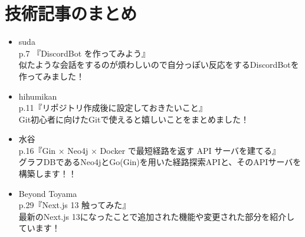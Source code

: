 \chapter{技術記事のまとめ}

\begin{itemize}
      \item suda \\
            p.7 『DiscordBot を作ってみよう』 \\
            似たような会話をするのが煩わしいので自分っぽい反応をするDiscordBotを作ってみました！ \\
      \item hihumikan \\
            p.11『リポジトリ作成後に設定しておきたいこと』 \\
            Git初心者に向けたGitで使えると嬉しいことをまとめました！ \\ 
      \item 水谷 \\
            p.16『Gin × Neo4j × Docker で最短経路を返す API サーバを建てる』 \\
            グラフDBであるNeo4jとGo(Gin)を用いた経路探索APIと、そのAPIサーバを構築します！！ \\
      \item Beyond Toyama \\
            p.29『Next.js 13 触ってみた』 \\
            最新のNext.js 13になったことで追加された機能や変更された部分を紹介しています！ \\
\end{itemize} 

